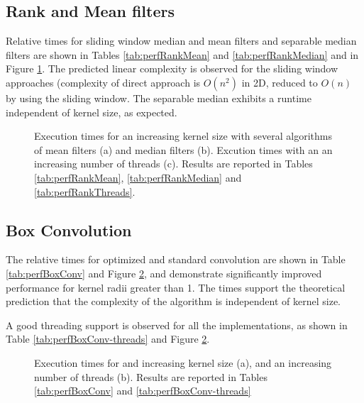\documentclass{InsightArticle}
\begin{document}
\subsection{Rank and Mean filters}
Relative times for sliding window median and mean filters and
separable median filters are shown in Tables \ref{tab:perfRankMean}
and \ref{tab:perfRankMedian} and in Figure \ref{fig:perfRank}. The
predicted linear complexity is observed for the sliding window
approaches (complexity of direct approach is $O(n^2)$ in 2D, reduced
to $O(n)$ by using the sliding window. The separable median exhibits a
runtime independent of kernel size, as expected.

\begin{figure}[htbp]
\begin{center}
\caption{Execution times for an increasing kernel size with several algorithms of mean filters (a) and
median filters (b). Excution times with an an increasing number of threads (c).\label{fig:perfRank}
Results are reported in Tables \ref{tab:perfRankMean}, \ref{tab:perfRankMedian}
and \ref{tab:perfRankThreads}.}
\end{center}
\end{figure}


\subsection{Box Convolution}
The relative times for optimized and standard convolution are shown in
Table \ref{tab:perfBoxConv} and Figure \ref{fig:perfBoxConv}, and demonstrate significantly improved
performance for kernel radii greater than 1. The times support the
theoretical prediction that the complexity of the algorithm is
independent of kernel size.

A good threading support is observed for all the implementations, as shown in Table
\ref{tab:perfBoxConv-threads} and Figure \ref{fig:perfBoxConv}.


\begin{figure}[htbp]
\begin{center}
\caption{Execution times for and increasing kernel size (a), and an increasing number of threads (b).
\label{fig:perfBoxConv}
Results are reported in Tables \ref{tab:perfBoxConv} and  \ref{tab:perfBoxConv-threads}}
\end{center}
\end{figure}
\end{document}
